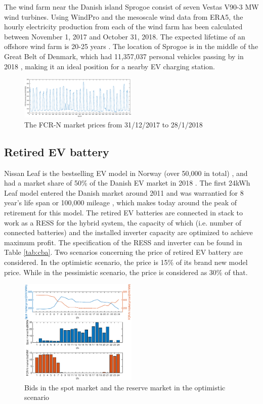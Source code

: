 \documentclass[final,5p,times,twocolumn,authoryear]{elsarticle}
\begin{document}
The wind farm near the Danish island Sprogoe consist of seven Vestas V90-3 MW wind turbines. Using WindPro and the mesoscale wind data from ERA5, the hourly electricity production from each of the wind farm has been calculated between November 1, 2017 and October 31, 2018. The expected lifetime of an offshore wind farm is 20-25 years \cite{Hou2017OffshoreOptimization}.  The location of Sprogoe is in the middle of the Great Belt of Denmark, which had 11,357,037 personal vehicles passing by in 2018 \cite{Storebaet}, making it an ideal position for a nearby EV charging station.
\begin{figure}[h]
    \centering
    \includegraphics[width=0.5\textwidth]{figures/FCRN.eps}
    \caption{The FCR-N market prices from 31/12/2017 to 28/1/2018}
    \label{fig:FCRN}
\end{figure}

\subsection{Retired EV battery}
Nissan Leaf is the bestselling EV model in Norway (over 50,000 in total) \cite{Elbilstatistikk}, and had a market share of 50\% of the Danish EV market in 2018 \cite{Nissan}.  The first 24kWh Leaf model entered the Danish market around 2011 and  was  warrantied  for  8  year’s  life  span  or  100,000  mileage \cite{Nissan1},  which  makes  today  around the  peak  of  retirement for this model. The retired EV  batteries  are  connected  in  stack  to work as a RESS for the hybrid system, the capacity of which (i.e.  number of connected batteries) and the installed inverter capacity are optimized to achieve maximum profit. The specification of the RESS and inverter can be found in Table \ref{tab:cba}. Two scenarios concerning the price of retired EV battery are considered. In the optimistic scenario, the price is 15\% of its brand new model price. While in the pessimistic scenario, the price is considered as 30\% of that.

\begin{figure}[h]
    \centering
    \includegraphics[width=0.5\textwidth]{figures/bids.eps}
    \caption{Bids in the spot market and the reserve market in the optimistic scenario}
    \label{fig:bids}
\end{figure}
\end{document}
